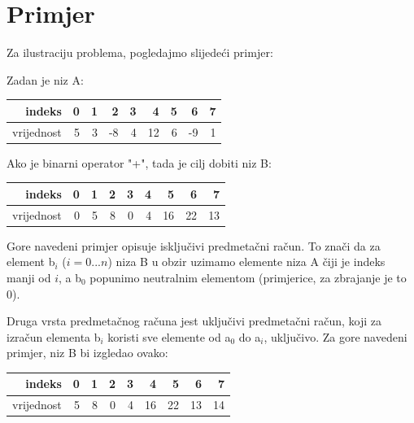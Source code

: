 \documentclass[times, utf8, zavrsni, numeric]{fer}
\begin{document}
\section{Primjer}

Za ilustraciju problema, pogledajmo slijedeći primjer:

Zadan je niz A:
\begin{center}
\begin{tabular}{| r | r | r | r | r | r | r | r | r |}
\hline
\cellcolor{lightgray}indeks & \cellcolor{lightgray}0 & \cellcolor{lightgray}1 & \cellcolor{lightgray}2 & \cellcolor{lightgray}3 & \cellcolor{lightgray}4 & \cellcolor{lightgray}5 & \cellcolor{lightgray}6 & \cellcolor{lightgray}7 \\
\hline
vrijednost & 5 & 3 & -8 & 4 & 12 & 6 & -9 & 1\\
\hline
\end{tabular}
\end{center}

Ako je binarni operator "+", tada je cilj dobiti niz B:
\begin{center}
\begin{tabular}{| r | r | r | r | r | r | r | r | r |}
\hline
\cellcolor{lightgray}indeks & \cellcolor{lightgray}0 & \cellcolor{lightgray}1 & \cellcolor{lightgray}2 & \cellcolor{lightgray}3 & \cellcolor{lightgray}4 & \cellcolor{lightgray}5 & \cellcolor{lightgray}6 & \cellcolor{lightgray}7 \\
\hline
vrijednost & 0 & 5 & 8 & 0 & 4 & 16 & 22 & 13\\
\hline
\end{tabular}
\end{center}

Gore navedeni primjer opisuje isključivi predmetačni račun. To znači da za element b$_{i}$ ($i = 0...n$) niza B u obzir uzimamo elemente niza A čiji je indeks manji od $i$, a b$_{0}$ popunimo neutralnim elementom (primjerice, za zbrajanje je to 0).

Druga vrsta predmetačnog računa jest uključivi predmetačni račun, koji za izračun elementa b$_{i}$ koristi sve elemente od a$_{0}$ do a$_{i}$, uključivo. Za gore navedeni primjer, niz B bi izgledao ovako:
\begin{center}
\begin{tabular}{| r | r | r | r | r | r | r | r | r |}
\hline
indeks & 0 & 1 & 2 & 3 & 4 & 5 & 6 & 7\\
\hline
vrijednost & 5 & 8 & 0 & 4 & 16 & 22 & 13 & 14\\
\hline
\end{tabular}
\end{center}
\end{document}
